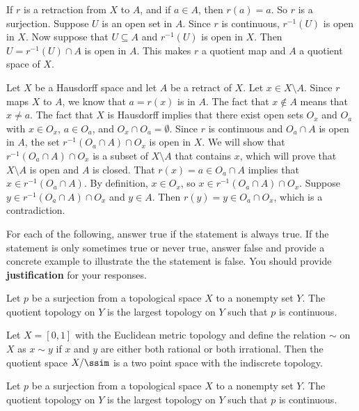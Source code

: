 \item If $r$ is a retraction from $X$ to $A$, and if $a \in A$, then $r(a) = a$. So $r$ is a surjection. Suppose $U$ is an open set in $A$. Since $r$ is continuous, $r^{-1}(U)$ is open in $X$.  Now suppose that $U \subseteq A$ and $r^{-1}(U)$ is open in $X$. Then $U = r^{-1}(U) \cap A$ is open in $A$. This makes $r$ a quotient map and $A$ a quotient space of $X$.

\item Let $X$ be a Hausdorff space and let $A$ be a retract of $X$. Let $x \in X \setminus A$. Since $r$ maps $X$ to $A$, we know that $a = r(x)$ is in $A$. The fact that $x \notin A$ means that $x \neq a$. The fact that $X$ is Hausdorff implies that there exist open sets $O_x$ and $O_a$ with $x \in O_x$, $a \in O_a$, and $O_x \cap O_a = \emptyset$. Since $r$ is continuous and $O_a \cap A$ is open in $A$, the set $r^{-1}(O_a \cap A) \cap O_x$ is open in $X$. We will show that $r^{-1}(O_a \cap A) \cap O_x$ is a subset of $X \setminus A$ that contains $x$, which will prove that $X \setminus A$ is open and $A$ is closed. That $r(x) = a \in O_a \cap A$ implies that $x \in r^{-1}(O_a \cap A)$. By definition, $x \in O_x$, so $x \in r^{-1}(O_a \cap A) \cap O_x$. Suppose $y \in r^{-1}(O_a \cap A) \cap O_x$ and $y \in A$. Then $r(y) = y \in O_a \cap O_x$, which is a contradiction. 

\ea



\item For each of the following, answer true if the statement is always true. If the statement is only sometimes true or never true, answer false and provide a concrete example to illustrate the the statement is false. You should provide \textbf{justification} for your responses. 
	\ba
	\item Let $p$ be a surjection from a topological space $X$ to a nonempty set $Y$. The quotient topology on $Y$ is the largest topology on $Y$ such that $p$ is continuous. 
	
	\item Let $X = [0,1]$ with the Euclidean metric topology and define the relation $\sim$ on $X$ as $x \sim y$ if $x$ and $y$ are either both rational or both irrational. Then the quotient space $X/\ssim$ is a two point space with the indiscrete topology. 

\item Let $p$ be a surjection from a topological space $X$ to a nonempty set $Y$. The quotient topology on $Y$ is the largest topology on $Y$ such that $p$ is continuous. 
	
